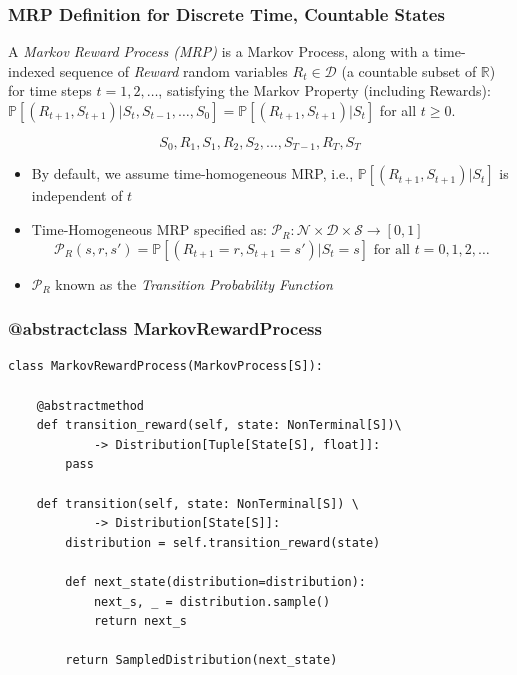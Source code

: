 \documentclass[handout]{beamer}
\begin{document}
\begin{frame}
\frametitle{MRP Definition for Discrete Time, Countable States}
\pause
\begin{definition}
 A {\em Markov Reward Process (MRP)} is a Markov Process, along with a time-indexed sequence of {\em Reward} random variables $R_t \in \mathcal{D}$ (a countable subset of $\mathbb{R}$) for time steps $t=1, 2, \ldots$, satisfying the Markov Property (including Rewards): $\mathbb{P}[(R_{t+1}, S_{t+1}) | S_t, S_{t-1}, \ldots, S_0] = \mathbb{P}[(R_{t+1}, S_{t+1}) | S_t]$ for all $t \geq 0$.
 \end{definition}
 \pause
  $$S_0, R_1, S_1, R_2, S_2, \ldots, S_{T-1}, R_T, S_T$$
  \pause
 \begin{itemize}[<+->]
\item By default, we assume time-homogeneous MRP, i.e., $\mathbb{P}[(R_{t+1}, S_{t+1}) | S_t]$ is independent of $t$
\item Time-Homogeneous MRP specified as: $\mathcal{P}_R: \mathcal{N} \times \mathcal{D} \times \mathcal{S} \rightarrow [0,1]$
$$\mathcal{P}_R(s,r,s') = \mathbb{P}[(R_{t+1}=r, S_{t+1}=s') | S_t=s] \text{ for all } t = 0, 1, 2, \ldots$$
\item $\mathcal{P}_R$ known as the {\em Transition Probability Function}
\end{itemize}
\end{frame}


\begin{frame}[fragile]
\frametitle{@abstractclass MarkovRewardProcess}
\pause
\begin{lstlisting}
class MarkovRewardProcess(MarkovProcess[S]):

    @abstractmethod
    def transition_reward(self, state: NonTerminal[S])\
            -> Distribution[Tuple[State[S], float]]:
        pass
        
    def transition(self, state: NonTerminal[S]) \
            -> Distribution[State[S]]:
        distribution = self.transition_reward(state)

        def next_state(distribution=distribution):
            next_s, _ = distribution.sample()
            return next_s

        return SampledDistribution(next_state)
\end{lstlisting}            
\end{frame}
\end{document}
